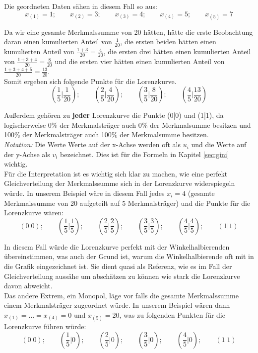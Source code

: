 \documentclass[a4paper]{article}
\newcommand\dangersign[1][2ex]{%
  \renewcommand\stacktype{L}%
  \scaleto{\stackon[1.3pt]{\color{red}$\triangle$}{\tiny !}}{#1}%
}
\begin{document}
\noindent Die geordneten Daten sähen in diesem Fall so aus:
$$x_{(1)} = 1;\qquad x_{(2)} = 3;\qquad x_{(3)} = 4;\qquad x_{(4)} = 5;\qquad x_{(5)} = 7$$

\noindent Da wir eine gesamte Merkmalssumme von 20 hätten, hätte die erste Beobachtung daran einen kumulierten Anteil von $\frac{1}{20}$, die ersten beiden hätten einen kumulierten Anteil von $\frac{1+3}{20} = \frac{4}{20}$, die ersten drei hätten einen kumulierten Anteil von $\frac{1+3+4}{20} = \frac{8}{20}$ und die ersten vier hätten einen kumulierten Anteil von $\frac{1+3+4+5}{20} = \frac{13}{20}$.\\
Somit ergeben sich folgende Punkte für die Lorenzkurve.
$$(\frac{1}{5}|\frac{1}{20});\qquad (\frac{2}{5}|\frac{4}{20});\qquad (\frac{3}{5}|\frac{8}{20});\qquad (\frac{4}{5}|\frac{13}{20})$$

\noindent Außerdem gehören zu \textbf{jeder} Lorenzkurve die Punkte (0|0) und (1|1), da logischerweise 0\% der Merkmalsträger auch 0\% der Merkmalsumme besitzen und 100\% der Merkmalsträger auch 100\% der Merkmalsumme besitzen.\\

\noindent \dangersign[3ex] \textit{Notation:} Die Werte Werte auf der x-Achse werden oft als $u_i$ und die Werte auf der y-Achse als $v_i$ bezeichnet. Dies ist für die Formeln in Kapitel \ref{sec:gini} wichtig.\\

\noindent Für die Interpretation ist es wichtig sich klar zu machen, wie eine perfekt Gleichverteilung der Merkmalssumme sich in der Lorenzkurve widerspiegeln würde. In unserem Beispiel wäre in diesem Fall jedes $x_i = 4$ (gesamte Merkmalssumme von 20 aufgeteilt auf 5 Merkmalsträger) und die Punkte für die Lorenzkurve wären:
$$(0|0);\qquad(\frac{1}{5}|\frac{1}{5});\qquad (\frac{2}{5}|\frac{2}{5});\qquad (\frac{3}{5}|\frac{3}{5});\qquad (\frac{4}{5}|\frac{4}{5});\qquad (1|1)$$

\noindent In diesem Fall würde die Lorenzkurve perfekt mit der Winkelhalbierenden übereinstimmen, was auch der Grund ist, warum die Winkelhalbierende oft mit in die Grafik eingezeichnet ist. Sie dient quasi als Referenz, wie es im Fall der Gleichverteilung aussähe um abschätzen zu können wie stark die Lorenzkurve davon abweicht.\\
Das andere Extrem, ein Monopol, läge vor falls die gesamte Merkmalssumme einem Merkmalsträger zugeordnet würde. In unserem Beispiel wären dann $x_{(1)} = \hdots = x_{(4)} = 0$ und $x_{(5)} = 20$, was zu folgenden Punkten für die Lorenzkurve führen würde:
$$(0|0);\qquad(\frac{1}{5}|0);\qquad (\frac{2}{5}|0);\qquad (\frac{3}{5}|0);\qquad (\frac{4}{5}|0);\qquad (1|1)$$
\end{document}
